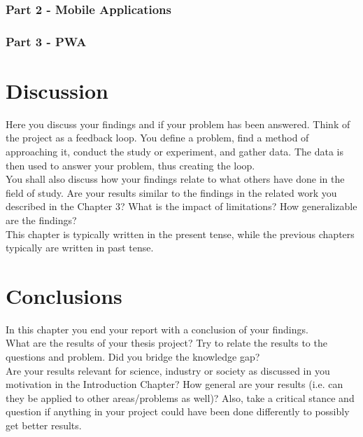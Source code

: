 \documentclass[a4paper,12pt]{article}
\begin{document}
\subsubsection{Part 2 - Mobile Applications}

\subsubsection{Part 3 - PWA}

	
\newpage
	
\section{Discussion}
Here you discuss your findings and if your problem has been answered. Think of the project as a feedback loop. You define a problem, find a method of approaching it, conduct the study or experiment, and gather data. The data is then used to answer your problem, thus creating the loop. \\

You shall also discuss how your findings relate to what others have done in the field of study. Are your results similar to the findings in the related work you described in the Chapter 3? What is the impact of limitations? How generalizable are the findings? \\

This chapter is typically written in the present tense, while the previous chapters typically are written in past tense.

\newpage
		
\section{Conclusions}
In this chapter you end your report with a conclusion of your findings.  \\

\noindent What are the results of your thesis project? Try to relate the results to the questions and problem. Did you bridge the knowledge gap? \\

\noindent Are your results relevant for science, industry or society as discussed in you motivation in the Introduction Chapter? How general are your results (i.e. can they be applied to other areas/problems as well)? Also, take a critical stance and question if anything in your project could have been done differently to possibly get better results. \\
\end{document}
